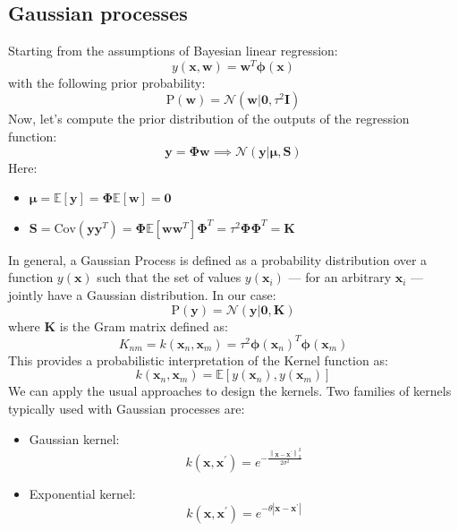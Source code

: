 \subsection{Gaussian processes}
Starting from the assumptions of Bayesian linear regression:
\[y(\textbf{x},\textbf{w})=\textbf{w}^T\boldsymbol{\phi}(\textbf{x})\]
with the following prior probability:
\[\text{P}(\textbf{w})=\mathcal{N}\left(\textbf{w}|\textbf{0},\tau^2\textbf{I}\right)\]
Now, let's compute the prior distribution of the outputs of the regression function:
\[\textbf{y}=\boldsymbol{\Phi}\textbf{w}\implies\mathcal{N}(\textbf{y}|\boldsymbol{\mu},\textbf{S})\]
Here: 
\begin{itemize}
    \item $\boldsymbol{\mu}=\mathbb{E}[\boldsymbol{y}]=\boldsymbol{\Phi}\mathbb{E}[\boldsymbol{w}]=\textbf{0}$
    \item $\textbf{S}=\text{Cov}(\textbf{yy}^T)=\boldsymbol{\Phi}\mathbb{E}[\boldsymbol{ww}^T] \boldsymbol{\Phi}^T=\tau^2 \boldsymbol{\Phi\Phi}^T=\textbf{K}$
\end{itemize}
In general, a Gaussian Process is defined as a probability distribution over a function $y(\textbf{x})$ such that the set of values $y(\textbf{x}_i)$ — for an arbitrary ${\textbf{x}_i}$ — jointly have a Gaussian distribution.
In our case:
\[\text{P}(\textbf{y})=\mathcal{N}\left(\textbf{y}|\textbf{0},\textbf{K}\right)\]
where $\textbf{K}$ is the Gram matrix defined as:
\[K_{nm}=k(\textbf{x}_n,\textbf{x}_m)=\tau^2\boldsymbol{\phi}{(\textbf{x}_n)}^T\boldsymbol{\phi}(\textbf{x}_m)\]
This provides a probabilistic interpretation of the Kernel function as:
\[k(\textbf{x}_n,\textbf{x}_m)=\mathbb{E}\left[ y(\textbf{x}_n),y(\textbf{x}_m) \right]\]
We can apply the usual approaches to design the kernels.
Two families of kernels typically used with Gaussian processes are:
\begin{itemize}
    \item Gaussian kernel: 
        \[k(\textbf{x},\textbf{x}^\prime)=e^{-\frac{\left\lVert \textbf{x} - \textbf{x}^\prime \right\rVert_2^2 }{2\sigma^2}}\]
    \item Exponential kernel: 
        \[k(\textbf{x},\textbf{x}^\prime)=e^{-\theta \left\lvert \textbf{x} - \textbf{x}^\prime\right\rvert}\]
\end{itemize}